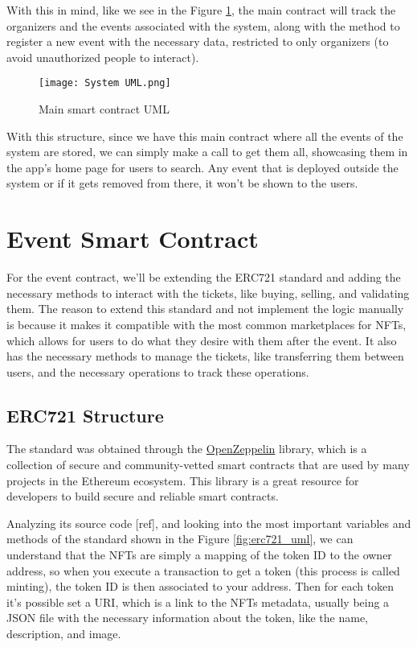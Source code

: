 With this in mind, like we see in the Figure \ref{fig:system_uml}, the main contract will track the organizers and the events associated with the system, along with the method to register a new event with the necessary data, restricted to only organizers (to avoid unauthorized people to interact).

\begin{figure}[H]
    \texttt{[image: System UML.png]}
    \centering
    \caption{Main smart contract UML}
    \label{fig:system_uml}
\end{figure}

With this structure, since we have this main contract where all the events of the system are stored, we can simply make a call to get them all, showcasing them in the app's home page for users to search. Any event that is deployed outside the system or if it gets removed from there, it won't be shown to the users.

\section{Event Smart Contract}
\label{sec:event_smart_contract}

For the event contract, we'll be extending the ERC721 standard and adding the necessary methods to interact with the tickets, like buying, selling, and validating them. The reason to extend this standard and not implement the logic manually is because it makes it compatible with the most common marketplaces for NFTs, which allows for users to do what they desire with them after the event. It also has the necessary methods to manage the tickets, like transferring them between users, and the necessary operations to track these operations.

\subsection{ERC721 Structure}
\label{subsec:erc721_structure}

The standard was obtained through the \href{https://docs.openzeppelin.com/contracts/api/token/erc721#ERC721}{OpenZeppelin} library, which is a collection of secure and community-vetted smart contracts that are used by many projects in the Ethereum ecosystem. This library is a great resource for developers to build secure and reliable smart contracts.

Analyzing its source code [ref], and looking into the most important variables and methods of the standard shown in the Figure \ref{fig:erc721_uml}, we can understand that the NFTs are simply a mapping of the token ID to the owner address, so when you execute a transaction to get a token (this process is called minting), the token ID is then associated to your address. Then for each token it's possible set a URI, which is a link to the NFTs metadata, usually being a JSON file with the necessary information about the token, like the name, description, and image.

